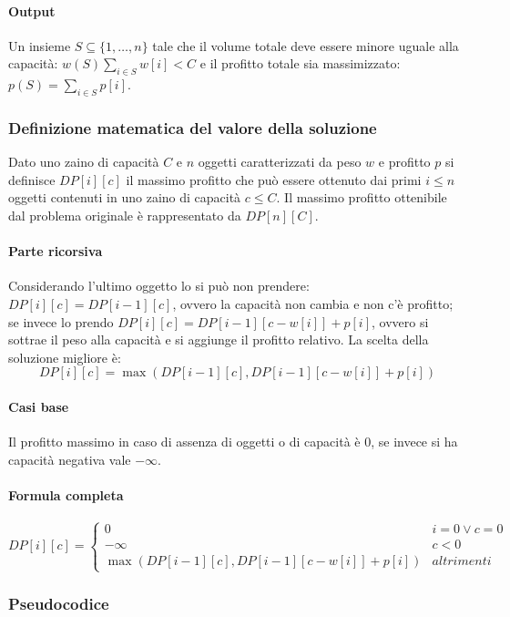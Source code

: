 			\paragraph{Output}
			Un insieme $S\subseteq\{1,\dots, n\}$ tale che il volume totale deve essere minore uguale alla capacit\`a: $w(S)\sum\limits_{i\in S}w[i]<C$ e il profitto
			totale sia massimizzato: $p(S)=\sum\limits_{i\in S}p[i]$.
		
		\subsubsection{Definizione matematica del valore della soluzione}
			Dato uno zaino di capacit\`a $C$ e $n$ oggetti caratterizzati da peso $w$ e profitto $p$ si definisce $DP[i][c]$ il massimo profitto che pu\`o essere 
			ottenuto dai primi $i\le n$ oggetti contenuti in uno zaino di capacit\`a $c\le C$. Il massimo profitto ottenibile dal problema originale \`e rappresentato
			da $DP[n][C]$.
			\paragraph{Parte ricorsiva}
			Considerando l'ultimo oggetto lo si pu\`o non prendere: $DP[i][c]=DP[i-1][c]$, ovvero la capacit\`a non cambia e non c'\`e profitto; se invece lo prendo
			$DP[i][c]=DP[i-1][c-w[i]]+p[i]$, ovvero si sottrae il peso alla capacit\`a e si aggiunge il profitto relativo. La scelta della soluzione migliore \`e:
			$$DP[i][c] = \max(DP[i-1][c], DP[i-1][c-w[i]]+p[i])$$
			\paragraph{Casi base}
			Il profitto massimo in caso di assenza di oggetti o di capacit\`a \`e $0$, se invece si ha capacit\`a negativa vale $-\infty$. 
			\paragraph{Formula completa}
			$$
			DP[i][c] =
			\begin{cases}
			0\quad & i = 0 \lor c = 0\\
			-\infty & c<0\\
			\max(DP[i-1][c], DP[i-1][c-w[i]]+p[i]) & altrimenti
			\end{cases}
			$$
		
		\subsubsection{Pseudocodice}
			
